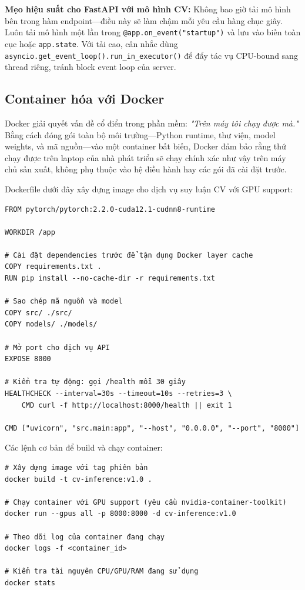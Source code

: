 \begin{mdframed}[style=infobox]
\textbf{Mẹo hiệu suất cho FastAPI với mô hình CV:} Không bao giờ tải mô hình bên trong hàm endpoint---điều này sẽ làm chậm mỗi yêu cầu hàng chục giây. Luôn tải mô hình một lần trong \texttt{@app.on\_event("startup")} và lưu vào biến toàn cục hoặc \texttt{app.state}. Với tải cao, cân nhắc dùng \texttt{asyncio.get\_event\_loop().run\_in\_executor()} để đẩy tác vụ CPU-bound sang thread riêng, tránh block event loop của server.
\end{mdframed}

\subsection{Container hóa với Docker}
\label{subsec:docker}

Docker giải quyết vấn đề cổ điển trong phần mềm: \textit{"Trên máy tôi chạy được mà."} Bằng cách đóng gói toàn bộ môi trường---Python runtime, thư viện, model weights, và mã nguồn---vào một container bất biến, Docker đảm bảo rằng thứ chạy được trên laptop của nhà phát triển sẽ chạy chính xác như vậy trên máy chủ sản xuất, không phụ thuộc vào hệ điều hành hay các gói đã cài đặt trước.

Dockerfile dưới đây xây dựng image cho dịch vụ suy luận CV với GPU support:

\begin{verbatim}
FROM pytorch/pytorch:2.2.0-cuda12.1-cudnn8-runtime

WORKDIR /app

# Cài đặt dependencies trước để tận dụng Docker layer cache
COPY requirements.txt .
RUN pip install --no-cache-dir -r requirements.txt

# Sao chép mã nguồn và model
COPY src/ ./src/
COPY models/ ./models/

# Mở port cho dịch vụ API
EXPOSE 8000

# Kiểm tra tự động: gọi /health mỗi 30 giây
HEALTHCHECK --interval=30s --timeout=10s --retries=3 \
    CMD curl -f http://localhost:8000/health || exit 1

CMD ["uvicorn", "src.main:app", "--host", "0.0.0.0", "--port", "8000"]
\end{verbatim}

Các lệnh cơ bản để build và chạy container:

\begin{verbatim}
# Xây dựng image với tag phiên bản
docker build -t cv-inference:v1.0 .

# Chạy container với GPU support (yêu cầu nvidia-container-toolkit)
docker run --gpus all -p 8000:8000 -d cv-inference:v1.0

# Theo dõi log của container đang chạy
docker logs -f <container_id>

# Kiểm tra tài nguyên CPU/GPU/RAM đang sử dụng
docker stats
\end{verbatim}

